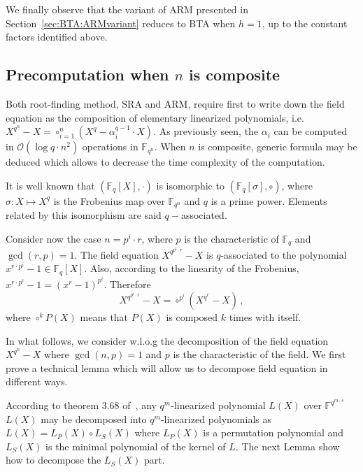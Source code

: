 \documentclass{sig-alternate}
\newcommand{\qq}{q}
\begin{document}
We finally observe that the variant of ARM presented in Section~\ref{sec:BTA:ARMvariant} reduces to BTA when $h=1$, up to the constant factors identified above.





\subsection{Precomputation when $n$ is composite}

\noindent Both root-finding method, SRA and ARM, require first to write down the field equation as the composition of elementary linearized polynomials, i.e. $X^{q^n}-X=\circ_{i=1}^n (X^q-\alpha_i^{q-1} \cdot X)$.
As previously seen, the $\alpha_i$ can be computed in $\mathcal{O}(\log q \cdot n^2)$ operations in $\mathbb{F}_{q^n}$. When $n$ is composite, generic formula may be deduced 
which allows to decrease the time complexity of the computation.

\medskip   

\noindent It is well known that $(\mathbb{F}_q[X],\cdot)$ is isomorphic to  $(\mathbb{F}_q[\sigma], \circ)$, where $\sigma: X \mapsto X^q$ is the Frobenius map over $\mathbb{F}_{q^n}$  and $q$ is a prime power. 
Elements related by this isomorphism are said $q-$associated. 

\medskip

\noindent Consider now the case $n=p^i \cdot r$, where $p$ is the characteristic of $\mathbb{F}_q$ and $\gcd(r,p)=1$.  
The field equation $X^{q^{p^i \cdot r}}-X$ is $q$-associated to the polynomial $x^{r\cdot p^i}-1 \in \mathbb{F}_q[X]$. Also, according
 to the linearity of the Frobenius,  $x^{r \cdot p^i}-1=(x^r-1)^{p^i}$. Therefore 
$$X^{q^{p^i \cdot r}}-X=\circ^{p^i} (X^{q^r}-X)\,,$$
where $\circ^{k} P(X)$ means that $P(X)$ is composed $k$ times with itself. 

\medskip

\noindent In what follows, we consider w.l.o.g the decomposition of the field equation $X^{\qq^n}-X$ where $\gcd(n,p)=1$ and $p$ is the characteristic of the field. We first prove a technical lemma which will allow us to decompose field equation in different ways.

\medskip

According to theorem 3.68 of~\cite{lidl1997finite}, any $\qq^m$-linearized polynomial $L(X)$ over $\mathbb{F}^{\qq^{m \cdot s}}$ $L(X)$ may be decomposed into $\qq^m$-linearized polynomials as $L(X)=L_P(X) \circ L_S(X)$ where $L_P(X)$ is a permutation  polynomial and $L_S(X)$ is the minimal polynomial of the kernel of $L$. The next Lemma show how to decompose the $L_S(X)$ part.
\end{document}
